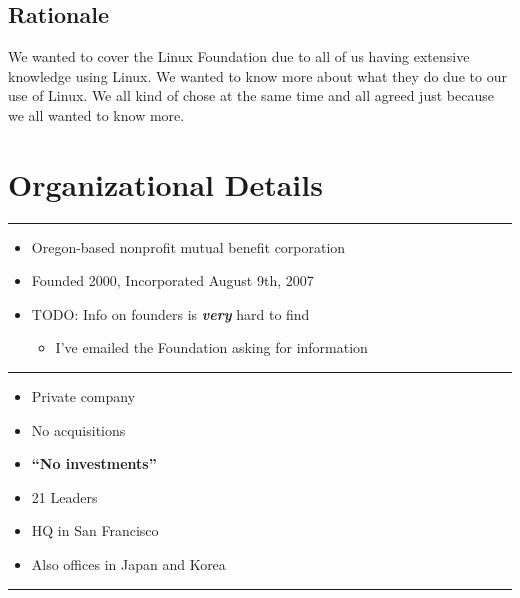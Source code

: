 \subsection{Rationale}\label{rationale}

We wanted to cover the Linux Foundation due to all of us having
extensive knowledge using Linux. We wanted to know more about what they
do due to our use of Linux. We all kind of chose at the same time and
all agreed just because we all wanted to know more.

\section{Organizational Details}\label{organizational-details}

\begin{center}\rule{3in}{0.4pt}\end{center}

\begin{itemize}
\itemsep1pt\parskip0pt
\item
  Oregon-based nonprofit mutual benefit corporation
\item
  Founded 2000, Incorporated August 9th, 2007
\item
  TODO: Info on founders is \textbf{\emph{very}} hard to find

  \begin{itemize}
  \itemsep1pt\parskip0pt
  \item
    I've emailed the Foundation asking for information
  \end{itemize}
\end{itemize}

\begin{center}\rule{3in}{0.4pt}\end{center}

\begin{itemize}
\itemsep1pt\parskip0pt
\item
  Private company
\item
  No acquisitions
\item
  \textbf{``No investments''}
\item
  21 Leaders
\item
  HQ in San Francisco
\item
  Also offices in Japan and Korea
\end{itemize}

\begin{center}\rule{3in}{0.4pt}\end{center}


